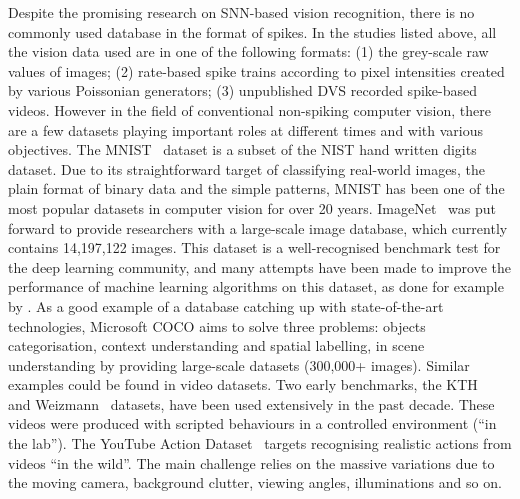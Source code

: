 \documentclass{frontiersENG} %
\begin{document}
Despite the promising research on SNN-based vision recognition, there is no commonly used database in the format of spikes.
In the studies listed above, all the vision data used are in one of the following formats:
(1) the grey-scale raw values of images;
(2) rate-based spike trains according to pixel intensities created by various Poissonian generators;
(3) unpublished DVS recorded spike-based videos.
However in the field of conventional non-spiking computer vision, there are a few datasets playing important roles at different times and with various objectives.
The MNIST~\citep{lecun1998gradient} dataset is a subset of the NIST hand written digits dataset.
Due to its straightforward target of classifying real-world images, the plain format of binary data and the simple patterns, MNIST has been one of the most popular datasets in computer vision for over 20 years.
ImageNet~\citep{deng2009imagenet} was put forward to provide researchers with a large-scale image database, which currently contains 14,197,122 images.
This dataset is a well-recognised benchmark test for the deep learning community, and many attempts have been made to improve the performance of machine learning algorithms on this dataset, as done for example by \citet{krizhevsky2012imagenet}.
As a good example of a database catching up with state-of-the-art technologies, Microsoft COCO aims to solve three problems: objects categorisation, context understanding and spatial labelling, in scene understanding by providing large-scale datasets (300,000+ images).
Similar examples could be found in video datasets.
Two early benchmarks, the KTH ~\citep{schuldt2004recognizing} and Weizmann~\citep{blank2005actions} datasets, have been used extensively in the past decade. 
These videos were produced with scripted behaviours in a controlled environment (``in the lab'').
The YouTube Action Dataset~\citep{liu2009recognizing} targets recognising realistic actions from videos ``in the wild''.
The main challenge relies on the massive variations due to the moving camera, background clutter, viewing angles, illuminations and so on.
\end{document}
